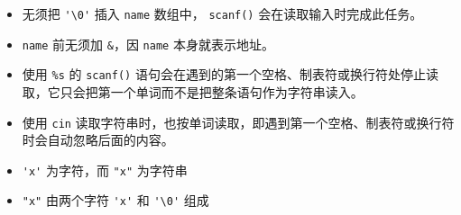 \begin{frame}[fragile]

  \begin{free}[C字符串的输入]{}
    \begin{itemize}
    \item 无须把 \lstinline|'\0'| 插入 \lstinline|name| 数组中， \lstinline|scanf()| 会在读取输入时完成此任务。\\[0.1in]
    \item  \lstinline|name| 前无须加 \lstinline|&|，因 \lstinline|name| 本身就表示地址。 \\[0.1in]
    \item 使用 \lstinline|%s| 的  \lstinline|scanf()|  语句会在遇到的第一个空格、制表符或换行符处停止读取，它只会把第一个单词而不是把整条语句作为字符串读入。\\[0.1in]
    \end{itemize}
  \end{free}

  \begin{free}[C++字符串的输入]{}
    \begin{itemize}
    \item 使用 \lstinline|cin| 读取字符串时，也按单词读取，即遇到第一个空格、制表符或换行符时会自动忽略后面的内容。\\[0.1in]
    \end{itemize}
  \end{free}

\end{frame}

\begin{frame}[fragile]
  \begin{free}{}
    \begin{itemize}
    \item  \lstinline|'x'| 为字符，而 \lstinline|"x"| 为字符串\\[0.1in]
    \item  \lstinline|"x"| 由两个字符 \lstinline|'x'| 和 \lstinline|'\0'| 组成
    \end{itemize}    
  \end{free}

\end{frame}

